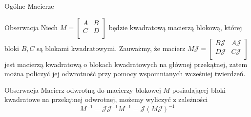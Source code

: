 \documentclass{beamer}
\begin{document}
\begin{frame}{Ogólne Macierze}
    \begin{block}{Obserwacja}
        Niech $M = \begin{bmatrix}
            A & B \\ C & D \\
        \end{bmatrix}$ będzie kwadratową macierzą blokową, której bloki $B, C$ są blokami kwadratowymi. 
        Zauważmy, że macierz $M\mathcal{J} = \begin{bmatrix}
            B\mathcal{J} & A\mathcal{J} \\ D\mathcal{J} & C\mathcal{J} \\
        \end{bmatrix}$ jest macierzą kwadratową o blokach kwadratowych na głównej przekątnej, zatem można policzyć jej odwrotność 
        przy pomocy wspomnianych wcześniej twierdzeń. 
    \end{block}
    \begin{block}{Obserwacja}
        Macierz odwrotną do macierzy blokowej $M$ posiadającej bloki kwadratowe na przekątnej odwrotnej, możemy wyliczyć z zależności
        $$M^{-1} = \mathcal{J}\mathcal{J}^{-1} M^{-1} = \mathcal{J} (M\mathcal{J})^{-1}$$
    \end{block}
\end{frame}
\end{document}

